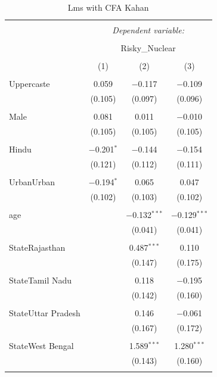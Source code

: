 \documentclass[
]{article}
\begin{document}
\begin{table}[!htbp] \centering 
  \caption{Lms with CFA Kahan} 
  \label{} 
\begin{tabular}{@{\extracolsep{5pt}}lccc} 
\\[-1.8ex]\hline 
\hline \\[-1.8ex] 
 & \multicolumn{3}{c}{\textit{Dependent variable:}} \\ 
\cline{2-4} 
\\[-1.8ex] & \multicolumn{3}{c}{Risky\_Nuclear} \\ 
\\[-1.8ex] & (1) & (2) & (3)\\ 
\hline \\[-1.8ex] 
 Uppercaste & 0.059 & $-$0.117 & $-$0.109 \\ 
  & (0.105) & (0.097) & (0.096) \\ 
  & & & \\ 
 Male & 0.081 & 0.011 & $-$0.010 \\ 
  & (0.105) & (0.105) & (0.105) \\ 
  & & & \\ 
 Hindu & $-$0.201$^{*}$ & $-$0.144 & $-$0.154 \\ 
  & (0.121) & (0.112) & (0.111) \\ 
  & & & \\ 
 UrbanUrban & $-$0.194$^{*}$ & 0.065 & 0.047 \\ 
  & (0.102) & (0.103) & (0.102) \\ 
  & & & \\ 
 age &  & $-$0.132$^{***}$ & $-$0.129$^{***}$ \\ 
  &  & (0.041) & (0.041) \\ 
  & & & \\ 
 StateRajasthan &  & 0.487$^{***}$ & 0.110 \\ 
  &  & (0.147) & (0.175) \\ 
  & & & \\ 
 StateTamil Nadu &  & 0.118 & $-$0.195 \\ 
  &  & (0.142) & (0.160) \\ 
  & & & \\ 
 StateUttar Pradesh &  & 0.146 & $-$0.061 \\ 
  &  & (0.167) & (0.172) \\ 
  & & & \\ 
 StateWest Bengal &  & 1.589$^{***}$ & 1.280$^{***}$ \\ 
  &  & (0.143) & (0.160) \\ 
  & & & \\ 

\end{tabular}
\end{table}
\end{document}
